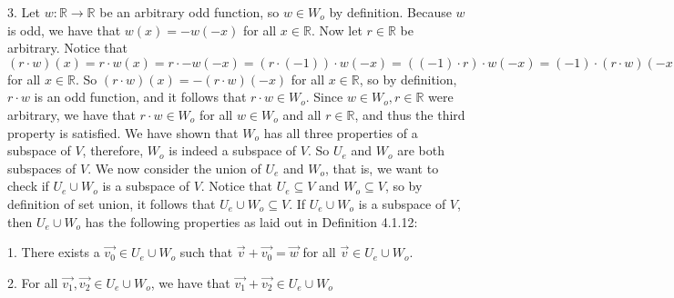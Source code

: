 \documentclass[12pt]{article}
\newenvironment{problem}[2][Problem]
{
	\begin{trivlist} 
		\item[\hskip \labelsep {\bfseries #1 #2:}]
	}
{
	\end{trivlist}
	}
\begin{document}
\begin{problem}{2}
3. Let $w: \mathbb{R} \to \mathbb{R}$ be an arbitrary odd function, so $w \in W_o$ by definition. Because $w$ is odd, we have that $w(x) = -w(-x)$ for all $x \in \mathbb{R}$. Now let $r \in \mathbb{R}$ be arbitrary. Notice that $(r\cdot w)(x) = r\cdot w(x) = r\cdot -w(-x) = (r\cdot (-1))\cdot w(-x) = ((-1) \cdot r) \cdot w(-x) = (-1) \cdot (r\cdot w)(-x) = -(r\cdot w)(-x)$ for all $x \in \mathbb{R}$. So $(r\cdot w)(x) = -(r\cdot w)(-x)$ for all $x \in \mathbb{R}$, so by definition, $r\cdot w$ is an odd function, and it follows that $r\cdot w \in W_o$. Since $w \in W_o, r\in \mathbb{R}$ were arbitrary, we have that $r \cdot w \in W_o$ for all $w \in W_o$ and all $r \in \mathbb{R}$, and thus the third property is satisfied. 
\noindent
\newline
\newline
We have shown that $W_o$ has all three properties of a subspace of $V$, therefore, $W_o$ is indeed a subspace of $V$.
\noindent
\newline
\newline
So $U_e$ and $W_o$ are both subspaces of $V$. We now consider the union of $U_e$ and $W_o$, that is, we want to check if $U_e\cup W_o$ is a subspace of $V$. Notice that $U_e \subseteq V$ and $W_o \subseteq V$, so by definition of set union, it follows that $U_e\cup W_o \subseteq V$.
If $U_e\cup W_o$ is a subspace of $V$, then $U_e\cup W_o$ has the following properties as laid out in Definition 4.1.12:

1. There exists a $\vec{v_0} \in U_e\cup W_o$ such that $\vec{v} + \vec{v_0} = \vec{w}$ for all $\vec{v} \in U_e\cup W_o$.

2. For all $\vec{v_1},\vec{v_2} \in U_e\cup W_o$, we have that $\vec{v_1}+\vec{v_2} \in U_e\cup W_o$


\end{problem}
\end{document}
